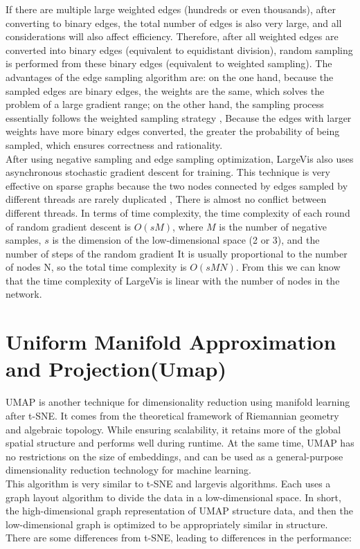 \noindent If there are multiple large weighted edges (hundreds or even thousands), after converting to binary edges, the total number of edges is also very large, and all considerations will also affect efficiency. Therefore, after all weighted edges are converted into binary edges (equivalent to equidistant division), random sampling is performed from these binary edges (equivalent to weighted sampling). The advantages of the edge sampling algorithm are: on the one hand, because the sampled edges are binary edges, the weights are the same, which solves the problem of a large gradient range; on the other hand, the sampling process essentially follows the weighted sampling strategy , Because the edges with larger weights have more binary edges converted, the greater the probability of being sampled, which ensures correctness and rationality.\\

\noindent After using negative sampling and edge sampling optimization, LargeVis also uses asynchronous stochastic gradient descent for training. This technique is very effective on sparse graphs because the two nodes connected by edges sampled by different threads are rarely duplicated , There is almost no conflict between different threads. In terms of time complexity, the time complexity of each round of random gradient descent is $O(sM)$, where $M$ is the number of negative samples, $s$ is the dimension of the low-dimensional space (2 or 3), and the number of steps of the random gradient It is usually proportional to the number of nodes N, so the total time complexity is $O(sMN)$. From this we can know that the time complexity of LargeVis is linear with the number of nodes in the network.

\chapter{Uniform Manifold Approximation and Projection(Umap)}

UMAP is another technique for dimensionality reduction using manifold learning after t-SNE. It comes from the theoretical framework of Riemannian geometry and algebraic topology. While ensuring scalability, it retains more of the global spatial structure and performs well during runtime. At the same time, UMAP has no restrictions on the size of embeddings, and can be used as a general-purpose dimensionality reduction technology for machine learning. \\

\noindent This algorithm is very similar to t-SNE and largevis algorithms. Each uses a graph layout algorithm to divide the data in a low-dimensional space. In short, the high-dimensional graph representation of UMAP structure data, and then the low-dimensional graph is optimized to be appropriately similar in structure. There are some differences from t-SNE, leading to differences in the performance:\\

